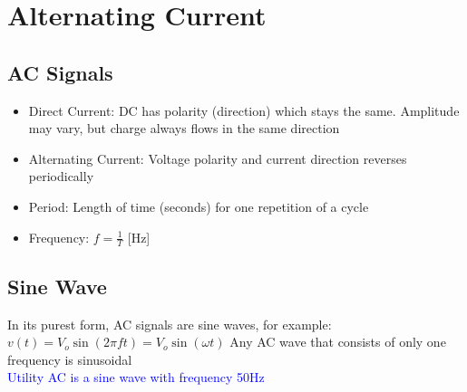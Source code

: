 \documentclass{book/custombook}
\author{Dinal Atapattu}
\begin{document}
    \maketitle
    \tableofcontents
    \chapter{Alternating Current}
        \section{AC Signals}
            \begin{itemize}
                \item Direct Current: DC has polarity (direction) which stays the same. Amplitude may vary, but
                    charge always flows in the same direction
                \item Alternating Current: Voltage polarity and current direction reverses periodically
                \item Period: Length of time (seconds) for one repetition of a cycle
                \item Frequency: $f = \frac{1}{T}$ [Hz]
            \end{itemize}
        \section{Sine Wave}
           In its purest form, AC signals are sine waves, for example:\\
            $ v(t) = V_o \sin\left(2\pi ft\right) = V_o\sin\left(\omega t\right) $
            Any AC wave that consists of only one frequency is sinusoidal\\
            \textcolor{blue}{Utility AC is a sine wave with frequency 50Hz}
\end{document}
